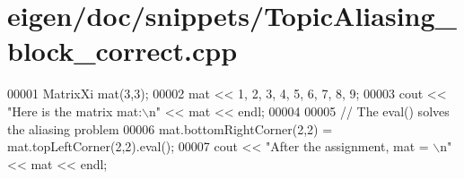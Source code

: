 \hypertarget{eigen_2doc_2snippets_2_topic_aliasing__block__correct_8cpp_source}{}\section{eigen/doc/snippets/\+Topic\+Aliasing\+\_\+block\+\_\+correct.cpp}
\label{eigen_2doc_2snippets_2_topic_aliasing__block__correct_8cpp_source}

\begin{DoxyCode}
00001 MatrixXi mat(3,3); 
00002 mat << 1, 2, 3,   4, 5, 6,   7, 8, 9;
00003 cout << \textcolor{stringliteral}{"Here is the matrix mat:\(\backslash\)n"} << mat << endl;
00004 
00005 \textcolor{comment}{// The eval() solves the aliasing problem}
00006 mat.bottomRightCorner(2,2) = mat.topLeftCorner(2,2).eval();
00007 cout << \textcolor{stringliteral}{"After the assignment, mat = \(\backslash\)n"} << mat << endl;
\end{DoxyCode}
